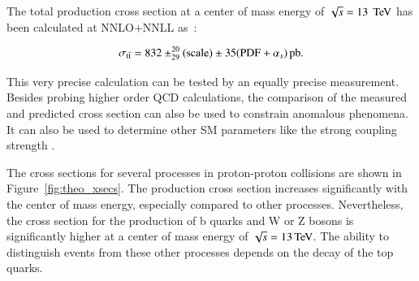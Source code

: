 The total production cross section at a center of mass energy of $\sqrt{s}=13\;\,\text{Te\hspace{-.08em}V}$ has been calculated at NNLO+NNLL as~\cite{Czakon:2013goa}:

\begin{equation}
\sigma_{\mathrm{t}\bar{\mathrm{t}}}   =    832 \pm^{20}_{29} {\rm (scale)} \pm 35({\rm PDF}+\alpha_s) \mbox{\ensuremath{\,\text{pb}}}. 
\end{equation}

This very precise calculation can be tested by an equally precise measurement. Besides probing higher order QCD calculations, the comparison of the measured and predicted cross section can also be used to constrain
anomalous phenomena. It can also be used to determine other SM parameters like the strong coupling strength \as.

The cross sections for several processes in proton-proton collisions are shown in Figure~\ref{fig:theo_xsecs}. The \ttbar production cross section increases significantly with the center of mass energy, especially compared to other 
processes.
Nevertheless, the cross section for the production of b quarks and W or Z bosons is significantly higher at a center of mass energy of $\sqrt{s}=13\,\text{Te\hspace{-.08em}V}$. The ability to distinguish \ttbar events from these other processes depends on 
the decay of the top quarks.


